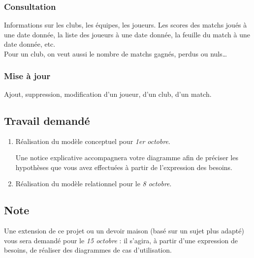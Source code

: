 \documentclass[a4,12pt]{article}
\begin{document}
\subsubsection*{Consultation}
Informations sur les clubs, les équipes, les joueurs. Les scores des matchs
joués à une date donnée, la liste des joueurs à une date donnée, la feuille du
match à une date donnée, etc.\\
Pour un club, on veut aussi le nombre de matchs gagnés, perdus ou nuls\ldots

\subsubsection*{Mise à jour}
Ajout, suppression, modification d'un joueur, d'un club, d'un match.

\subsection*{Travail demandé}
\begin{enumerate}
    \item Réalisation du modèle conceptuel pour \emph{1er octobre}.

        Une notice explicative accompagnera votre diagramme afin de préciser les
        hypothèses que vous avez effectuées à partir de l'expression des
        besoins.
    \item Réalisation du modèle relationnel pour le \emph{8 octobre}.
\end{enumerate}

\subsection*{Note}
Une extension de ce projet ou un devoir maison (basé sur un sujet plus adapté)
vous sera demandé pour le \emph{15 octobre} : il s'agira, à partir d'une
expression de besoins, de réaliser des diagrammes de cas d'utilisation.
\end{document}
